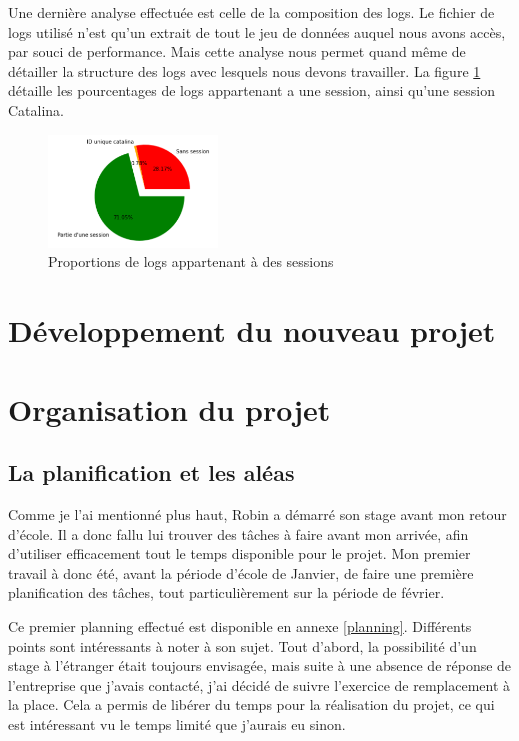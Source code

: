 \documentclass[openany, 11pt]{memoir}
\begin{document}
Une dernière analyse effectuée est celle de la composition des \glspl{log}. Le fichier de \glspl{log} utilisé n'est qu'un extrait de tout le jeu de données auquel nous avons accès, par souci de performance. Mais cette analyse nous permet quand même de détailler la structure des \glspl{log} avec lesquels nous devons travailler. La figure \ref{proportionsess} détaille les pourcentages de \glspl{log} appartenant a une session, ainsi qu'une session Catalina.

\begin{figure}[ht]
	\centering
	\includegraphics[width=0.4\textwidth]{images/proportionsess.png}
	\caption{Proportions de logs appartenant à des sessions}
	\label{proportionsess}
\end{figure}

\newpage
\chapter{Développement du nouveau projet}


\newpage
\chapter{Organisation du projet}

\section{La planification et les aléas}

Comme je l'ai mentionné plus haut, Robin a démarré son stage avant mon retour d'école. Il a donc fallu lui trouver des tâches à faire avant mon arrivée, afin d'utiliser efficacement tout le temps disponible pour le projet. Mon premier travail à donc été, avant la période d'école de Janvier, de faire une première planification des tâches, tout particulièrement sur la période de février.

Ce premier planning effectué est disponible en annexe \ref{planning}. Différents points sont intéressants à noter à son sujet. Tout d'abord, la possibilité d'un stage à l'étranger était toujours envisagée, mais suite à une absence de réponse de l'entreprise que j'avais contacté, j'ai décidé de suivre l'exercice de remplacement à la place. Cela a permis de libérer du temps pour la réalisation du projet, ce qui est intéressant vu le temps limité que j'aurais eu sinon.
\end{document}
